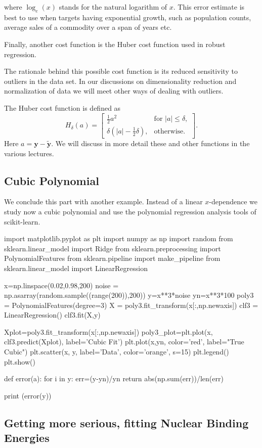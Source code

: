\documentclass[%
oneside,                 %
final,                   %
10pt]{article}
\begin{document}
where $\log_e (x)$ stands for the natural logarithm of $x$. This error
estimate is best to use when targets having exponential growth, such
as population counts, average sales of a commodity over a span of
years etc. 


Finally, another cost function is the Huber cost function used in robust regression.

The rationale behind this possible cost function is its reduced
sensitivity to outliers in the data set. In our discussions on
dimensionality reduction and normalization of data we will meet other
ways of dealing with outliers.

The Huber cost function is defined as
\[
H_{\delta}(a)=\begin{bmatrix}\frac{1}{2}a^{2}& \text{for }|a|\leq \delta ,\\ \delta (|a|-{\frac {1}{2}}\delta ),&\text{otherwise.}\end{bmatrix}.
\]
Here $a=\bm{y} - \bm{\tilde{y}}$.
We will discuss in more
detail these and other functions in the various lectures.

\subsection{Cubic Polynomial}
We conclude this part with another example. Instead of 
a linear $x$-dependence we study now a cubic polynomial and use the polynomial regression analysis tools of scikit-learn. 

\bpycod
import matplotlib.pyplot as plt
import numpy as np
import random
from sklearn.linear_model import Ridge
from sklearn.preprocessing import PolynomialFeatures
from sklearn.pipeline import make_pipeline
from sklearn.linear_model import LinearRegression

x=np.linspace(0.02,0.98,200)
noise = np.asarray(random.sample((range(200)),200))
y=x**3*noise
yn=x**3*100
poly3 = PolynomialFeatures(degree=3)
X = poly3.fit_transform(x[:,np.newaxis])
clf3 = LinearRegression()
clf3.fit(X,y)

Xplot=poly3.fit_transform(x[:,np.newaxis])
poly3_plot=plt.plot(x, clf3.predict(Xplot), label='Cubic Fit')
plt.plot(x,yn, color='red', label="True Cubic")
plt.scatter(x, y, label='Data', color='orange', s=15)
plt.legend()
plt.show()

def error(a):
    for i in y:
        err=(y-yn)/yn
    return abs(np.sum(err))/len(err)

print (error(y))
\epycod

\subsection{Getting more serious, fitting Nuclear Binding Energies}
\end{document}

